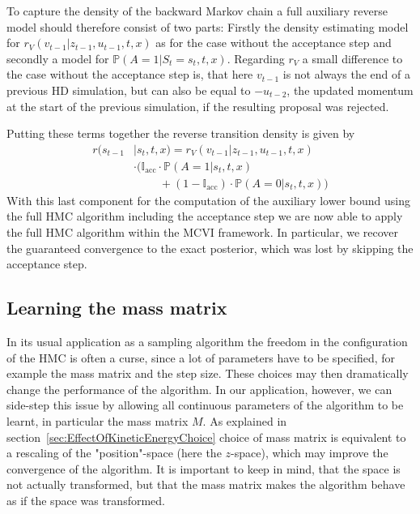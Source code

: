 To capture the density of the backward Markov chain a full auxiliary reverse model should therefore consist of two parts: Firstly the density estimating model for $r_V(v_{t-1}|z_{t-1}, u_{t-1}, t, x)$ as for the case without the acceptance step and secondly a model for $\mathbb{P}(A = 1|S_t = s_t, t, x)$. Regarding $r_V$ a small difference to the case without the acceptance step is, that here $v_{t-1}$ is not always the end of a previous HD simulation, but can also be equal to  $-u_{t-2}$, the updated momentum at the start of the previous simulation, if the resulting proposal was rejected. 

Putting these terms together the reverse transition density is given by
\begin{equation}
\begin{split}
r(s_{t-1} &| s_t, t, x) = r_V(v_{t-1}| z_{t-1}, u_{t-1}, t, x) \\
&\cdot \Big( \mathbb{I}_\textrm{acc} \cdot \mathbb{P}(A = 1 | s_{t}, t, x) \\
&\qquad\; + (1 - \mathbb{I}_\textrm{acc}) \cdot \mathbb{P}(A = 0 | s_{t}, t, x) \Big)
\end{split}
\end{equation}
With this last component for the computation of the auxiliary lower bound using the full HMC algorithm including the acceptance step we are now able to apply the full HMC algorithm within the MCVI framework. In particular, we recover the guaranteed convergence to the exact posterior, which was lost by skipping the acceptance step.

\subsection{Learning the mass matrix}
\label{sec:MassMatrixChoice}
In its usual application as a sampling algorithm the freedom in the configuration of the HMC is often a curse, since a lot of parameters have to be specified, for example the mass matrix and the step size. These choices may then dramatically change the performance of the algorithm. In our application, however, we can side-step this issue by allowing all continuous parameters of the algorithm to be learnt, in particular the mass matrix $M$. As explained in section~\ref{sec:EffectOfKineticEnergyChoice} choice of mass matrix is equivalent to a rescaling of the "position"-space (here the $z$-space), which may improve the convergence of the algorithm. It is important to keep in mind, that the space is not actually transformed, but that the mass matrix makes the algorithm behave as if the space was transformed.

